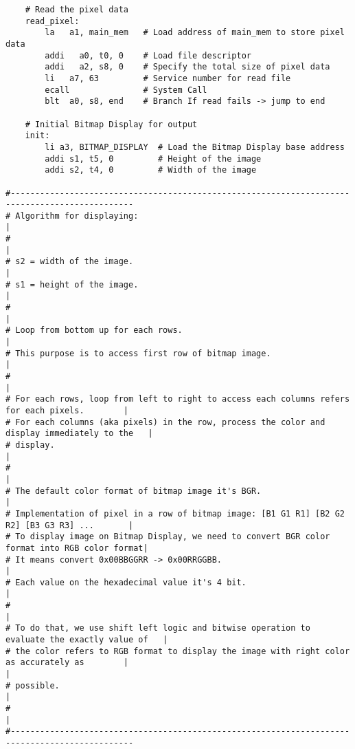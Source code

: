 \documentclass{article}
\begin{document}
\begin{verbatim}
    # Read the pixel data
    read_pixel:
        la   a1, main_mem   # Load address of main_mem to store pixel data
        addi   a0, t0, 0    # Load file descriptor
        addi   a2, s8, 0    # Specify the total size of pixel data
        li   a7, 63         # Service number for read file
        ecall               # System Call       
        blt  a0, s8, end    # Branch If read fails -> jump to end
    
    # Initial Bitmap Display for output
    init:
        li a3, BITMAP_DISPLAY  # Load the Bitmap Display base address
        addi s1, t5, 0         # Height of the image
        addi s2, t4, 0         # Width of the image
    
#-----------------------------------------------------------------------------------------------
# Algorithm for displaying:                                                                    |
#                                                                                              |
# s2 = width of the image.                                                                     |
# s1 = height of the image.                                                                    |
#                                                                                              |
# Loop from bottom up for each rows.                                                           |
# This purpose is to access first row of bitmap image.                                         |
#                                                                                              | 
# For each rows, loop from left to right to access each columns refers for each pixels.        |
# For each columns (aka pixels) in the row, process the color and display immediately to the   | 
# display.                                                                                     |
#                                                                                              |
# The default color format of bitmap image it's BGR.                                           |
# Implementation of pixel in a row of bitmap image: [B1 G1 R1] [B2 G2 R2] [B3 G3 R3] ...       |
# To display image on Bitmap Display, we need to convert BGR color format into RGB color format|
# It means convert 0x00BBGGRR -> 0x00RRGGBB.                                                   |
# Each value on the hexadecimal value it's 4 bit.                                              |
#                                                                                              |
# To do that, we use shift left logic and bitwise operation to evaluate the exactly value of   |
# the color refers to RGB format to display the image with right color as accurately as        |                                                                            |
# possible.                                                                                    |
#                                                                                              |
#-----------------------------------------------------------------------------------------------
    

\end{verbatim}
\end{document}
